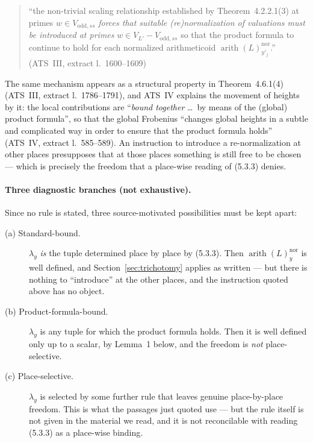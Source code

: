 \documentclass[11pt,a4paper]{article}
\theoremstyle{definition}
\theoremstyle{plain}
\theoremstyle{definition}
\newcommand{\arith}{\operatorname{arith}}
\newcommand{\anchor}[2]{(#1, extract l.~#2)}
\begin{document}
\begin{quote}\small
``the non-trivial scaling relationship established by Theorem~4.2.2.1(3) at primes
$w \in V_{\mathrm{odd},ss}$ \emph{forces that suitable (re)normalization of
valuations must be introduced at primes} $w \in V_{L'} - V_{\mathrm{odd},ss}$ so
that the product formula to continue to hold for each normalized arithmeticoid
$\arith(L)^{\mathrm{nor}}_{y'_j}$.'' \hfill\anchor{ATS~III}{1600--1609}
\end{quote}

The same mechanism appears as a structural property in Theorem~4.6.1(4)
\anchor{ATS~III}{1786--1791}, and ATS~IV explains the movement of heights by it:
the local contributions are ``\emph{bound together} \ldots\ by means of the
(global) product formula'', so that the global Frobenius ``changes global heights
in a subtle and complicated way in order to ensure that the product formula
holds'' \anchor{ATS~IV}{585--589}. An instruction to introduce a re-normalization
at other places presupposes that at those places something is still free to be
chosen --- which is precisely the freedom that a place-wise reading of (5.3.3)
denies.

\paragraph{Three diagnostic branches (not exhaustive).}
Since no rule is stated, three source-motivated possibilities must be kept apart:

\begin{description}
\item[(a) Standard-bound.] $\lambda_y$ \emph{is} the tuple determined place by
  place by (5.3.3). Then $\arith(L)^{\mathrm{nor}}_y$ is well defined, and
  Section~\ref{sec:trichotomy} applies as written --- but there is nothing to
  ``introduce'' at the other places, and the instruction quoted above has no
  object.
\item[(b) Product-formula-bound.] $\lambda_y$ is any tuple for which the product
  formula holds. Then it is well defined only up to a scalar, by Lemma~1 below,
  and the freedom is \emph{not} place-selective.
\item[(c) Place-selective.] $\lambda_y$ is selected by some further rule that
  leaves genuine place-by-place freedom. This is what the passages just quoted
  use --- but the rule itself is not given in the material we read, and it is not
  reconcilable with reading (5.3.3) as a place-wise binding.
\end{description}
\end{document}
